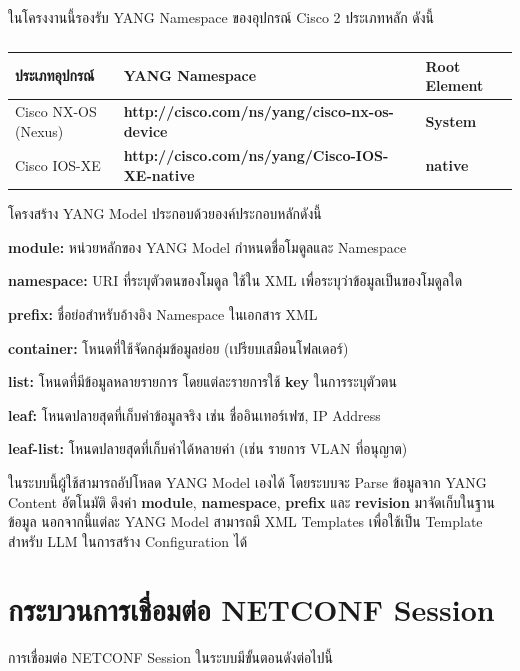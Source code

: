 \hspace*{1.3em}
ในโครงงานนี้รองรับ YANG Namespace ของอุปกรณ์ Cisco 2 ประเภทหลัก ดังนี้

\begin{table}[H]
\centering
\caption{}
\label{tabD:YangNamespaces}
\begin{tabularx}{\textwidth}{|l|X|l|}
\hline
\textbf{ประเภทอุปกรณ์} & \textbf{YANG Namespace} & \textbf{Root Element} \\
\hline
Cisco NX-OS (Nexus) & \textbf{http://cisco.com/ns/yang/cisco-nx-os-device} & \textbf{System} \\
\hline
Cisco IOS-XE & \textbf{http://cisco.com/ns/yang/Cisco-IOS-XE-native} & \textbf{native} \\
\hline
\end{tabularx}
\end{table}

\hspace*{1.3em}
โครงสร้าง YANG Model ประกอบด้วยองค์ประกอบหลักดังนี้

\begin{mycustomenum2}
    \item \textbf{module:} หน่วยหลักของ YANG Model กำหนดชื่อโมดูลและ Namespace
    \item \textbf{namespace:} URI ที่ระบุตัวตนของโมดูล ใช้ใน XML เพื่อระบุว่าข้อมูลเป็นของโมดูลใด
    \item \textbf{prefix:} ชื่อย่อสำหรับอ้างอิง Namespace ในเอกสาร XML
    \item \textbf{container:} โหนดที่ใช้จัดกลุ่มข้อมูลย่อย (เปรียบเสมือนโฟลเดอร์)
    \item \textbf{list:} โหนดที่มีข้อมูลหลายรายการ โดยแต่ละรายการใช้ \textbf{key} ในการระบุตัวตน
    \item \textbf{leaf:} โหนดปลายสุดที่เก็บค่าข้อมูลจริง เช่น ชื่ออินเทอร์เฟซ, IP Address
    \item \textbf{leaf-list:} โหนดปลายสุดที่เก็บค่าได้หลายค่า (เช่น รายการ VLAN ที่อนุญาต)
\end{mycustomenum2}

\hspace*{1.3em}
ในระบบนี้ผู้ใช้สามารถอัปโหลด YANG Model เองได้ โดยระบบจะ Parse ข้อมูลจาก YANG Content อัตโนมัติ ดึงค่า \textbf{module}, \textbf{namespace}, \textbf{prefix} และ \textbf{revision} มาจัดเก็บในฐานข้อมูล นอกจากนี้แต่ละ YANG Model สามารถมี XML Templates เพื่อใช้เป็น Template สำหรับ LLM ในการสร้าง Configuration ได้

\section{กระบวนการเชื่อมต่อ NETCONF Session}
\hspace*{1.3em}
การเชื่อมต่อ NETCONF Session ในระบบมีขั้นตอนดังต่อไปนี้

